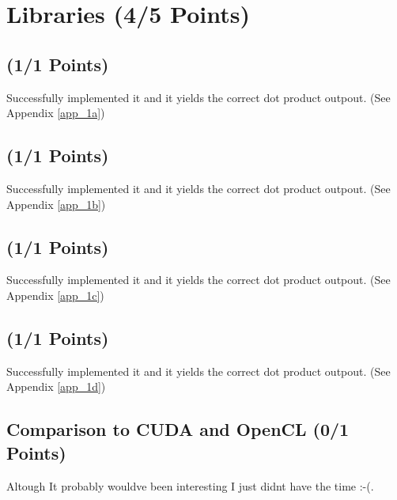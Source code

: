 \section{Libraries (4/5 Points)}
\subsection{ (1/1 Points)}
Successfully implemented it and it yields the correct dot product outpout. (See Appendix \ref{app_1a})

\subsection{ (1/1 Points)}
Successfully implemented it and it yields the correct dot product outpout. (See Appendix \ref{app_1b})

\subsection{ (1/1 Points)}
Successfully implemented it and it yields the correct dot product outpout. (See Appendix \ref{app_1c})

\subsection{ (1/1 Points)}
Successfully implemented it and it yields the correct dot product outpout. (See Appendix \ref{app_1d})

\subsection{Comparison to CUDA and OpenCL (0/1 Points)}
Altough It probably wouldve been interesting I just didnt have the time :-(.

\pagebreak